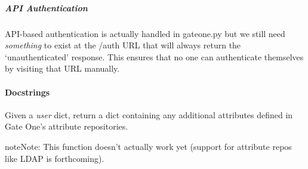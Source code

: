 \documentclass[letterpaper,10pt,openany]{sphinxmanual}
\begin{document}
\subparagraph{API Authentication}
\label{Developer/authentication:api-authentication}
API-based authentication is actually handled in gateone.py but we still need
\emph{something} to exist at the /auth URL that will always return the
`unauthenticated' response.  This ensures that no one can authenticate
themselves by visiting that URL manually.


\paragraph{Docstrings}
\label{Developer/authentication:docstrings}

\begin{fulllineitems}
\label{Developer/authentication:gateone.auth.authentication.additional_attributes}
Given a \emph{user} dict, return a dict containing any additional attributes
defined in Gate One's attribute repositories.

\begin{notice}{note}{Note:}
This function doesn't actually work yet (support for attribute repos
like LDAP is forthcoming).
\end{notice}

\end{fulllineitems}

\end{document}

